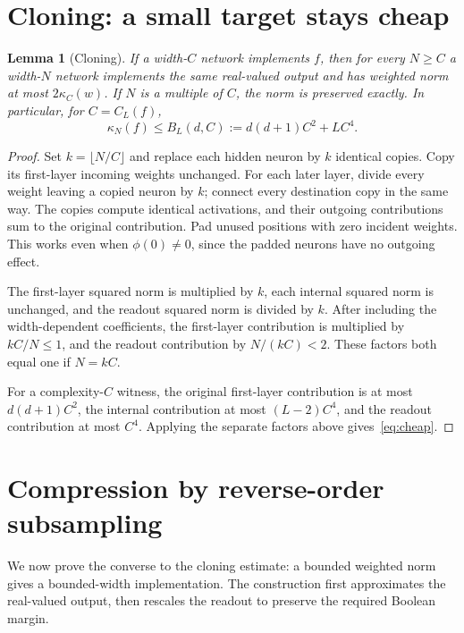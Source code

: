 \documentclass[11pt]{article}
\newtheorem{lemma}[theorem]{Lemma}
\theoremstyle{definition}
\begin{document}
\section{Cloning: a small target stays cheap}\label{sec:cloning}
\begin{lemma}[Cloning]\label{lem:cloning}
If a width-$C$ network implements $f$, then for every $N\geq C$ a width-$N$ network implements the same real-valued output and has weighted norm at most $2\kappa_C(w)$. If $N$ is a multiple of $C$, the norm is preserved exactly. In particular, for $C=C_L(f)$,
\begin{equation}\label{eq:cheap}
 \kappa_N(f)\leq B_L(d,C):=d(d+1)C^2+LC^4.
\end{equation}
\end{lemma}
\begin{proof}
Set $k=\lfloor N/C\rfloor$ and replace each hidden neuron by $k$ identical copies. Copy its first-layer incoming weights unchanged. For each later layer, divide every weight leaving a copied neuron by $k$; connect every destination copy in the same way. The copies compute identical activations, and their outgoing contributions sum to the original contribution. Pad unused positions with zero incident weights. This works even when $\phi(0)\ne0$, since the padded neurons have no outgoing effect.

The first-layer squared norm is multiplied by $k$, each internal squared norm is unchanged, and the readout squared norm is divided by $k$. After including the width-dependent coefficients, the first-layer contribution is multiplied by $kC/N\leq1$, and the readout contribution by $N/(kC)<2$. These factors both equal one if $N=kC$.

For a complexity-$C$ witness, the original first-layer contribution is at most $d(d+1)C^2$, the internal contribution at most $(L-2)C^4$, and the readout contribution at most $C^4$. Applying the separate factors above gives~\eqref{eq:cheap}.
\end{proof}

\section{Compression by reverse-order subsampling}\label{sec:compression}
We now prove the converse to the cloning estimate: a bounded weighted norm
gives a bounded-width implementation. The construction first approximates
the real-valued output, then rescales the readout to preserve the required
Boolean margin.


\end{document}
